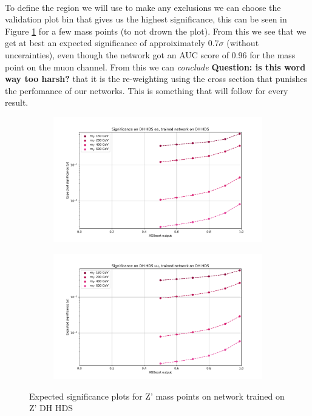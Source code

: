 \documentclass[12pt, a4paper]{book}
\begin{document}
\\To define the region we will use to make any exclusions we can choose the validation plot bin that gives us the highest significance, this can be seen in Figure \ref{fig:DH_HDS_exp_sig} for a few mass points (to not drown the plot). From this we see that we get at best an expected significance 
of approiximately 0.7$\sigma$ (without uncerainties), even though the network got an AUC score of 0.96 for the mass point on the muon channel. From this we can \textit{conclude} \textbf{Question: is this word way too harsh?} that it is the re-weighting using the cross section that punishes 
the perfomance of our networks. This is something that will follow for every result.\\
\begin{figure}[!ht]
	\centering
	\begin{subfigure}[b]{0.49\textwidth}
      \centering
      \includegraphics[width=1\textwidth]{XGBoost/DH_HDS/EXP_SIG_ee.pdf}
      \end{subfigure}
   \hfill
   \begin{subfigure}[b]{0.49\textwidth}
      \centering
      \includegraphics[width=1\textwidth]{XGBoost/DH_HDS/EXP_SIG_uu.pdf}
      \end{subfigure}
   \caption{Expected significance plots for Z' mass points on network trained on Z' DH HDS}\label{fig:DH_HDS_exp_sig}
\end{figure}
\end{document}
